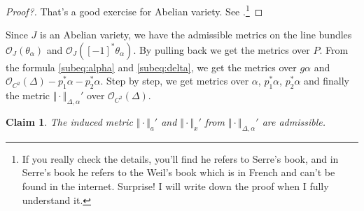 \documentclass[reqno,11pt]{amsart}
\numberwithin{equation}{section}
\theoremstyle{plain}
\newtheorem{claim}[theorem]{Claim}
\theoremstyle{plain}
\numberwithin{equation}{section}
\theoremstyle{remark}
\newcommand{\norm}[1]{\Vert{#1}\Vert}
\begin{document}
\begin{proof}[Proof?]
That's a good exercise for Abelian variety. See \cite[Lemma A.3]{yuan2021arithmetic}.\footnote{If you really check the details, you'll find he refers to Serre's book, and in Serre's book he refers to the Weil's book which is in French and can't be found in the internet. Surprise! I will write down the proof when I fully understand it.}
\end{proof}

Since $J$ is an Abelian variety, we have the admissible metrics on the line bundles $\mathcal{O}_J(\theta_{\alpha})$ and $\mathcal{O}_J([-1]^* \theta_{\alpha})$. By pulling back we get the metrics over $P$. From the formula \eqref{subeq:alpha} and \eqref{subeq:delta}, we get the metrics over $g\alpha$ and $\mathcal{O}_{C^2}(\Delta)-p_1^*\alpha-p_2^*\alpha$. Step by step, we get metrics over $\alpha$, $p_1^*\alpha$, $p_2^*\alpha$ and finally the metric $\norm{\cdot}_{\Delta,\alpha}'$ over $\mathcal{O}_{C^2}(\Delta)$.
\begin{claim}
The induced metric $\norm{\cdot}_a'$ and $\norm{\cdot}_x'$ from $\norm{\cdot}_{\Delta,\alpha}'$ are admissible.
\end{claim}
\end{document}
